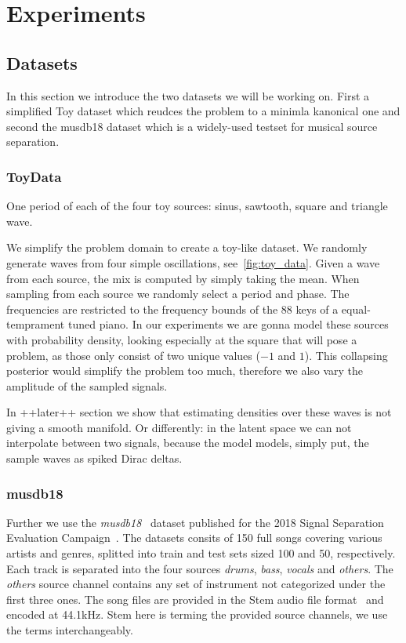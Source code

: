 \chapter{Experiments}%
\label{ch:experiments}

\section{Datasets}
In this section we introduce the two datasets we will be working on. First a simplified Toy dataset which reudces the problem to a minimla kanonical one and second the musdb18 dataset which is a widely-used testset for musical source separation.

\subsection{ToyData}
\begin{marginfigure}[5em]
    \resizebox{\textwidth}{!}{%
    }%
    \caption{One period of each of the four toy sources: sinus, sawtooth, square and triangle wave.}%
    \label{fig:toy_data}
\end{marginfigure}

We simplify the problem domain to create a toy-like dataset. We randomly generate waves from four simple oscillations, see~\cref{fig:toy_data}. Given a wave from each source, the mix is computed by simply taking the mean. When sampling from each source we randomly select a period and phase. The frequencies are restricted to the frequency bounds of the 88 keys of a equal-temprament tuned piano. In our experiments we are gonna model these sources with probability density, looking especially at the square that will pose a problem, as those only consist of two unique values (\(-1\) and \(1\)). This collapsing posterior would simplify the problem too much, therefore we also vary the amplitude of the sampled signals.

In ++later++ section we show that estimating densities over these waves is not giving a smooth manifold. Or differently: in the latent space we can not interpolate between two signals, because the model models, simply put, the sample waves as spiked Dirac deltas.


\subsection{musdb18}
Further we use the \emph{musdb18}~\cite{rafiiMUSDB182017} dataset published for the 2018 Signal Separation Evaluation Campaign~\cite{stoter20182018}. The datasets consits of 150 full songs covering various artists and genres, splitted into train and test sets sized 100 and 50, respectively. Each track is separated into the four sources \emph{drums}, \emph{bass}, \emph{vocals} and \emph{others}. The \emph{others} source channel contains any set of instrument not categorized under the first three ones. The song files are provided in the Stem audio file format~\cite{nativeinstrumentsStem} and encoded at 44.1kHz. Stem here is terming the provided source channels, we use the terms interchangeably.

